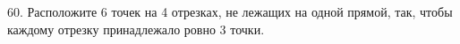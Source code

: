 60. Расположите 6 точек на 4 отрезках, не лежащих на одной прямой, так, чтобы каждому отрезку принадлежало ровно 3 точки.\\
